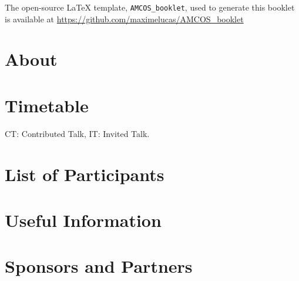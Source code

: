 \documentclass[openany, parskip=full, 12pt, a4]{scrbook}
\begin{document}
	
	
\mbox{}
\thispagestyle{empty}
\vfill
\begin{center}
The open-source \LaTeX{} template, \verb"AMCOS_booklet", used to generate this booklet is available at \url{https://github.com/maximelucas/AMCOS\_booklet}
\end{center}

\newpage

\tableofcontents

\chapter{About}



\chapter{Timetable}

CT: Contributed Talk, IT: Invited Talk.
\newpage



\chapter{List of Participants}
 

 
\chapter{Useful Information}



\chapter{Sponsors and Partners}



\newpage


\pagecolor{myblue}
\thispagestyle{empty}
\mbox{}
\end{document}
